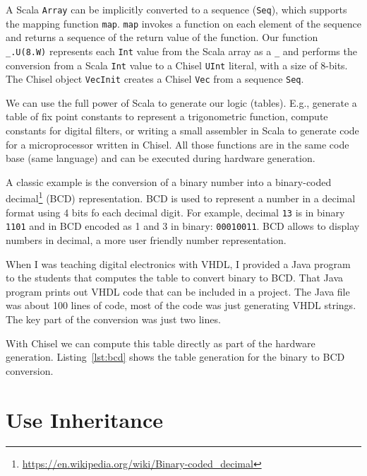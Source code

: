 \documentclass[%
    10pt,
    headinclude, footexclude,
    openright, %
    notitlepage,
    cleardoubleempty,
    headsepline,
    pointlessnumbers,
    bibtotoc, idxtotoc,
    ]{scrbook}
\newcommand{\code}[1]{{\small{\texttt{#1}}}}
\newcommand{\myref}[2]{\href{#1}{#2}}
\renewcommand{\myref}[2]{{#2}{\footnote{\url{#1}}}}
\begin{document}
\noindent A Scala \code{Array} can be implicitly converted to a sequence (\code{Seq}),
which supports the mapping function \code{map}.
\code{map} invokes a function on each element of the sequence and returns
a sequence of the return value of the function. Our function \code{\_.U(8.W)} represents
each \code{Int} value from the Scala array as a \code{\_} and performs the conversion
from a Scala \code{Int} value to a Chisel \code{UInt} literal, with a size of 8-bits.
The Chisel object \code{VecInit} creates a Chisel \code{Vec} from a sequence \code{Seq}.



We can use the full power of Scala to generate our logic (tables).
E.g., generate a table of fix point constants to represent a trigonometric function,
compute constants for digital filters, or writing a small assembler in Scala
to generate code for a microprocessor written in Chisel. All those functions
are in the same code base (same language) and can be executed during
hardware generation.

A classic example is the conversion of a binary number
into a \myref{https://en.wikipedia.org/wiki/Binary-coded_decimal}{binary-coded decimal}
(BCD) representation. BCD is used to represent a number in a decimal
format using 4 bits fo each decimal digit. For example, decimal \code{13} is in binary
\code{1101} and in BCD encoded as 1 and 3 in binary: \code{00010011}.
BCD allows to display numbers in decimal, a more user friendly number
representation.


When I was teaching digital electronics with VHDL, I provided a Java program
to the students that computes the table to convert binary to BCD.
That Java program prints out VHDL code that can be included in a project.
The Java file was about 100 lines of code, most of the code was just generating
VHDL strings. The key part of the conversion was just two lines.

With Chisel we can compute this table directly as part of the hardware generation.
Listing~\ref{lst:bcd} shows the table generation for the binary to BCD conversion.


\section{Use Inheritance}
\end{document}
